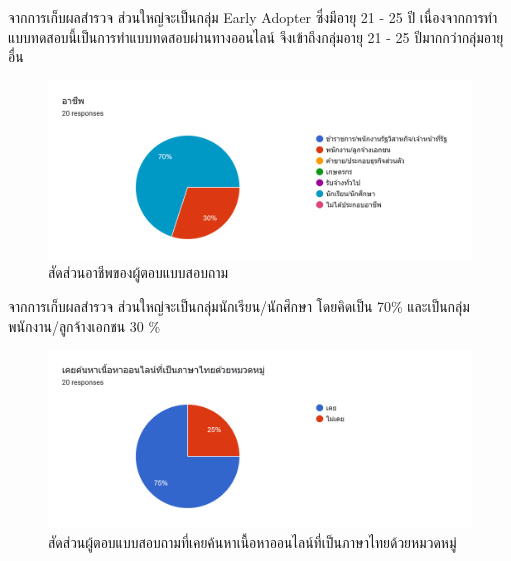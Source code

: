 \documentclass[12pt,oneside,openright,a4paper]{cpe-thai-project}
\begin{document}
\begin{itemize}
\begin{enumerate}
      \hspace{1cm}จากการเก็บผลสำรวจ ส่วนใหญ่จะเป็นกลุ่ม Early Adopter ซึ่งมีอายุ 21 - 25 ปี
      เนื่องจากการทำแบบทดสอบนี้เป็นการทำแบบทดสอบผ่านทางออนไลน์ จึงเข้าถึงกลุ่มอายุ 21 - 25 ปีมากกว่ากลุ่มอายุอื่น
      \newpage
      \begin{figure}[!ht]\centering
        \includegraphics[width=\textwidth]{./img/test/job.png}
        \caption{สัดส่วนอาชีพของผู้ตอบแบบสอบถาม}\label{fig:user_test_job}
      \end{figure}
      
      \hspace{1cm}จากการเก็บผลสำรวจ ส่วนใหญ่จะเป็นกลุ่มนักเรียน/นักศึกษา โดยคิดเป็น 70\% และเป็นกลุ่มพนักงาน/ลูกจ้างเอกชน 30 \%
      \begin{figure}[!ht]\centering
        \includegraphics[width=\textwidth]{./img/test/search.png}
        \caption{สัดส่วนผู้ตอบแบบสอบถามที่เคยค้นหาเนื้อหาออนไลน์ที่เป็นภาษาไทยด้วยหมวดหมู่}\label{fig:user_test_search}
      \end{figure}
      

\end{enumerate}
\end{itemize}
\end{document}
